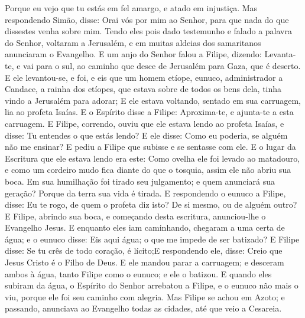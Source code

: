 {  Porque eu vejo que tu estás em fel amargo, e atado em injustiça.
  Mas respondendo Simão, disse: Orai vós por mim ao Senhor, para que nada do que dissestes venha sobre mim.
  Tendo eles pois dado testemunho e falado a palavra do Senhor, voltaram a Jerusalém, e em muitas aldeias dos samaritanos anunciaram o Evangelho.
  E um anjo do Senhor falou a Filipe, dizendo: Levanta-te, e vai para o sul, ao caminho que desce de Jerusalém para Gaza, que é deserto.
  E ele levantou-se, e foi, e eis que um homem etíope, eunuco, administrador
{} a Candace, a rainha dos etíopes, que estava sobre
{} de todos os bens dela, tinha vindo a Jerusalém para adorar;
  E ele estava voltando, sentado em sua carruagem,
{} lia ao profeta Isaías.
  E o Espírito disse a Filipe: Aproxima-te, e ajunta-te a esta carruagem.
  E Filipe, correndo, ouviu que ele estava lendo ao profeta Isaías, e disse: Tu entendes o que estás lendo?
  E ele disse: Como eu poderia, se alguém não me ensinar? E pediu a Filipe que subisse e se sentasse com ele.
  E o lugar da Escritura que ele estava lendo era este: Como ovelha ele foi levado ao matadouro, e como um cordeiro mudo fica diante do que o tosquia, assim
{} ele não abriu sua boca.
  Em sua humilhação foi tirado seu julgamento; e quem anunciará sua geração? Porque da terra sua vida é tirada.
  E respondendo o eunuco a Filipe, disse: Eu te rogo, de quem o profeta diz isto? De si mesmo, ou de alguém outro?
  E Filipe, abrindo sua boca, e começando desta escritura, anunciou-lhe o Evangelho
{} Jesus.
  E enquanto eles iam caminhando, chegaram a uma certa
{} de água; e o eunuco disse: Eis aqui água; o que me impede de ser batizado?
  E Filipe disse: Se tu crês de todo coração,
{} é lícito;E respondendo ele, disse: Creio que Jesus Cristo é o Filho de Deus.
  E ele mandou parar a carruagem; e desceram ambos à água, tanto Filipe como o eunuco; e ele o batizou.
  E quando eles subiram da água, o Espírito do Senhor arrebatou a Filipe, e o eunuco não mais o viu, porque ele foi
{} seu caminho com alegria.
  Mas Filipe se achou em Azoto; e passando, anunciava ao Evangelho
{} todas as cidades, até que veio a Cesareia.
\par }

